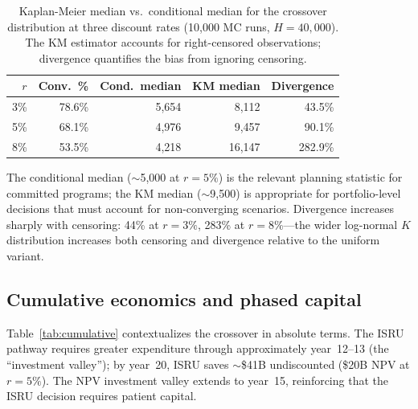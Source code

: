 \documentclass[preprint,12pt]{elsarticle}
\begin{document}
\begin{table}[htbp]
\centering
\caption{Kaplan-Meier median vs.\ conditional median for the crossover distribution at three discount rates (10{,}000 MC runs, $H = 40{,}000$). The KM estimator accounts for right-censored observations; divergence quantifies the bias from ignoring censoring.}
\label{tab:kaplan_meier}
\small
\begin{tabular}{@{}rrrrr@{}}
\toprule
$r$ & Conv.\ \% & Cond.\ median & KM median & Divergence \\
\midrule
3\%  & 78.6\% & 5{,}654 & 8{,}112  & 43.5\% \\
5\%  & 68.1\% & 4{,}976 & 9{,}457  & 90.1\% \\
8\%  & 53.5\% & 4{,}218 & 16{,}147 & 282.9\% \\
\bottomrule
\end{tabular}
\end{table}

The conditional median ($\sim$5{,}000 at $r = 5\%$) is the relevant planning statistic for committed programs; the KM median ($\sim$9{,}500) is appropriate for portfolio-level decisions that must account for non-converging scenarios. Divergence increases sharply with censoring: 44\% at $r = 3\%$, 283\% at $r = 8\%$---the wider log-normal $K$ distribution increases both censoring and divergence relative to the uniform variant.

\subsection{Cumulative economics and phased capital}
\label{sec:phased_capital}

Table~\ref{tab:cumulative} contextualizes the crossover in absolute terms. The ISRU pathway requires greater expenditure through approximately year~12--13 (the ``investment valley''); by year~20, ISRU saves $\sim$\$41B undiscounted (\$20B NPV at $r = 5\%$). The NPV investment valley extends to year~15, reinforcing that the ISRU decision requires patient capital.
\end{document}
